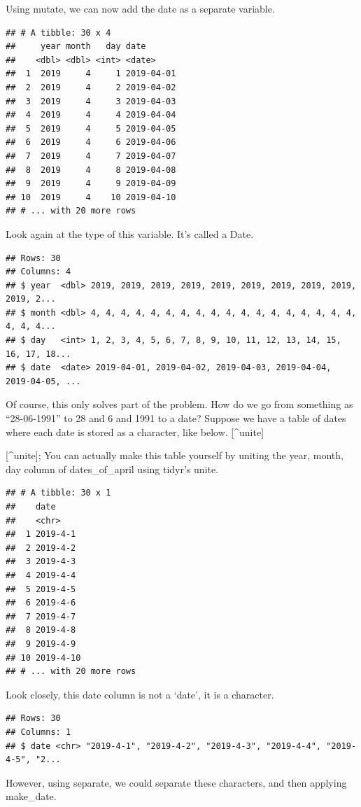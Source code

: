 \documentclass[]{tufte-book}
\begin{document}
Using mutate, we can now add the date as a separate variable.

\begin{verbatim}
## # A tibble: 30 x 4
##     year month   day date      
##    <dbl> <dbl> <int> <date>    
##  1  2019     4     1 2019-04-01
##  2  2019     4     2 2019-04-02
##  3  2019     4     3 2019-04-03
##  4  2019     4     4 2019-04-04
##  5  2019     4     5 2019-04-05
##  6  2019     4     6 2019-04-06
##  7  2019     4     7 2019-04-07
##  8  2019     4     8 2019-04-08
##  9  2019     4     9 2019-04-09
## 10  2019     4    10 2019-04-10
## # ... with 20 more rows
\end{verbatim}

Look again at the type of this variable. It's called a Date.

\begin{verbatim}
## Rows: 30
## Columns: 4
## $ year  <dbl> 2019, 2019, 2019, 2019, 2019, 2019, 2019, 2019, 2019, 2019, 2...
## $ month <dbl> 4, 4, 4, 4, 4, 4, 4, 4, 4, 4, 4, 4, 4, 4, 4, 4, 4, 4, 4, 4, 4...
## $ day   <int> 1, 2, 3, 4, 5, 6, 7, 8, 9, 10, 11, 12, 13, 14, 15, 16, 17, 18...
## $ date  <date> 2019-04-01, 2019-04-02, 2019-04-03, 2019-04-04, 2019-04-05, ...
\end{verbatim}

Of course, this only solves part of the problem. How do we go from something as ``28-06-1991'' to 28 and 6 and 1991 to a date? Suppose we have a table of dates where each date is stored as a character, like below. {[}\^{}unite{]}

{[}\^{}unite{]}; You can actually make this table yourself by uniting the year, month, day column of dates\_of\_april using tidyr's unite.

\begin{verbatim}
## # A tibble: 30 x 1
##    date     
##    <chr>    
##  1 2019-4-1 
##  2 2019-4-2 
##  3 2019-4-3 
##  4 2019-4-4 
##  5 2019-4-5 
##  6 2019-4-6 
##  7 2019-4-7 
##  8 2019-4-8 
##  9 2019-4-9 
## 10 2019-4-10
## # ... with 20 more rows
\end{verbatim}

Look closely, this date column is not a `date', it is a character.

\begin{verbatim}
## Rows: 30
## Columns: 1
## $ date <chr> "2019-4-1", "2019-4-2", "2019-4-3", "2019-4-4", "2019-4-5", "2...
\end{verbatim}

However, using separate, we could separate these characters, and then applying make\_date.
\end{document}
